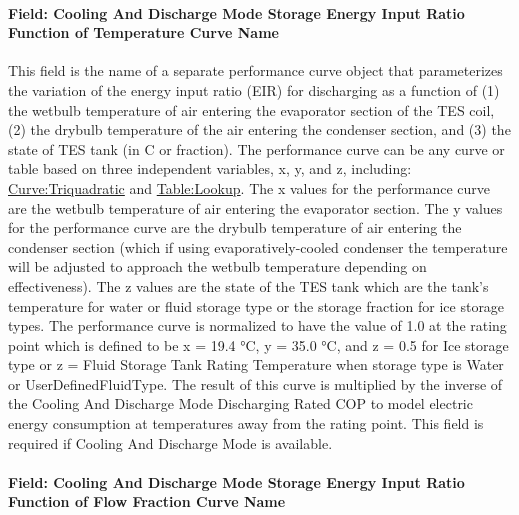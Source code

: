 \paragraph{Field: Cooling And Discharge Mode Storage Energy Input Ratio Function of Temperature Curve Name}\label{field-cooling-and-discharge-mode-storage-energy-input-ratio-function-of-temperature-curve-name}

This field is the name of a separate performance curve object that parameterizes the variation of the energy input ratio (EIR) for discharging as a function of (1) the wetbulb temperature of air entering the evaporator section of the TES coil, (2) the drybulb temperature of the air entering the condenser section, and (3) the state of TES tank (in C or fraction). The performance curve can be any curve or table based on three independent variables, x, y, and z, including: \hyperref[curvetriquadratic]{Curve:Triquadratic} and \hyperref[tablelookup]{Table:Lookup}. The x values for the performance curve are the wetbulb temperature of air entering the evaporator section. The y values for the performance curve are the drybulb temperature of air entering the condenser section (which if using evaporatively-cooled condenser the temperature will be adjusted to approach the wetbulb temperature depending on effectiveness). The z values are the state of the TES tank which are the tank's temperature for water or fluid storage type or the storage fraction for ice storage types. The performance curve is normalized to have the value of 1.0 at the rating point which is defined to be x = 19.4 °C, y = 35.0 °C, and z = 0.5 for Ice storage type or z = Fluid Storage Tank Rating Temperature when storage type is Water or UserDefinedFluidType. The result of this curve is multiplied by the inverse of the Cooling And Discharge Mode Discharging Rated COP to model electric energy consumption at temperatures away from the rating point. This field is required if Cooling And Discharge Mode is available.

\paragraph{Field: Cooling And Discharge Mode Storage Energy Input Ratio Function of Flow Fraction Curve Name}\label{field-cooling-and-discharge-mode-storage-energy-input-ratio-function-of-flow-fraction-curve-name}

